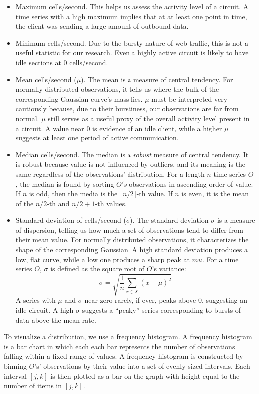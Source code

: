 \begin{itemize}
	\item Maximum cells/second. This helps us assess the activity level of a circuit. A time series with a high maximum implies that at at least one point in time, the client was sending a large amount of outbound data.
	\item Minimum cells/second. Due to the bursty nature of web traffic, this is not a useful statistic for our research. Even a highly active circuit is likely to have idle sections at 0 cells/second.
	\item Mean cells/second ($\mu$). The mean is a measure of central tendency. For normally distributed observations, it tells us where the bulk of the corresponding Gaussian curve's mass lies. $\mu$ must be interpreted very cautiously because, due to their burstiness, our observations are far from normal. $\mu$ still serves as a useful proxy of the overall activity level present in a circuit. A value near 0 is evidence of an idle client, while a higher $\mu$ suggests at least one period of active communication.
	\item Median cells/second. The median is a \textit{robust} measure of central tendency. It is robust because value is not influenced by outliers, and its meaning is the same regardless of the observations' distribution. For a length $n$ time series $O$, the median is found by sorting $O's$ observations in ascending order of value. If $n$ is odd, then the media is the $\lceil n/2 	\rceil$-th value. If $n$ is even, it is the mean of the $n/2$-th and $n/2 + 1$-th values.
	\item Standard deviation of cells/second ($\sigma$). The standard deviation $\sigma$ is a measure of dispersion, telling us how much a set of observations tend to differ from their mean value. For normally distributed observations, it characterizes the shape of the corresponding Gaussian. A high standard deviation produces a low, flat curve, while a low one produces a sharp peak at $mu$. For a time series $O$, $\sigma$ is defined as the square root of $O$'s variance:
	\[\sigma=\sqrt{\frac{1}{n}\sum\limits_{x \in X} (x-\mu)^2} \]
	A series with $\mu$ and $\sigma$ near zero rarely, if ever, peaks above 0,  suggesting an idle circuit. A high $\sigma$ suggests a ``peaky'' series corresponding to bursts of data above the mean rate.
\end{itemize}

  To visualize a distribution, we use a frequency histogram. A frequency histogram is a bar chart in which each each bar represents the number of observations falling within a fixed range of values. A frequency histogram is constructed by binning $O$'s' observations by their value into a set of evenly sized intervals. Each interval $[j, k]$ is then plotted as a bar on the graph with height equal to the number of items in $[j, k]$.

